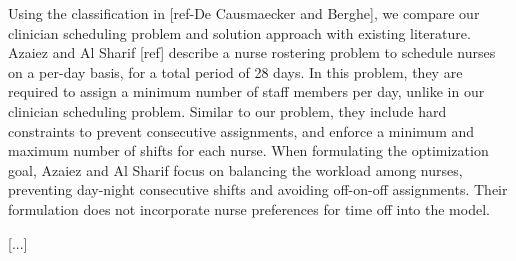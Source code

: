 Using the classification in [ref-De Causmaecker and Berghe], we compare our clinician
scheduling problem and solution approach with existing literature. Azaiez and Al Sharif [ref]
describe a nurse rostering problem to schedule nurses on a per-day basis, for a total period
of 28 days. In this problem, they are required to assign a minimum number of staff members
per day, unlike in our clinician scheduling problem. Similar to our problem, they include
hard constraints to prevent consecutive assignments, and enforce a minimum and maximum 
number of shifts for each nurse. When formulating the optimization goal, Azaiez and Al Sharif
focus on balancing the workload among nurses, preventing day-night consecutive shifts and avoiding
off-on-off assignments. Their formulation does not incorporate nurse preferences
for time off into the model. 

[...]
